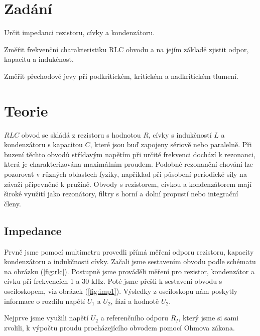 \documentclass[a4paper,11pt]{article}
\begin{document}
\vskip1cm
\begin{minipage}[t]{1\textwidth}
    \section{Zadání}
        Určit impedanci rezistoru, cívky a kondenzátoru. 
        \par Změřit frekvenční charakteristiku RLC obvodu a na jejím základě zjistit odpor, kapacitu a indukčnost.
        \par Změřit přechodové jevy při podkritickém, kritickém a nadkritickém tlumení.
\end{minipage}
    \par
\vspace{10px}
\begin{minipage}[t]{0.5\textwidth} 
    \section{Teorie}
        $RLC$ obvod se skládá z rezistoru s hodnotou $R$, cívky s indukčností $L$ a kondenzátoru s kapacitou $C$, které jsou buď zapojeny sériově nebo paralelně. Při buzení těchto obvodů střídavým napětím při určité frekvenci dochází k rezonanci, která je charakterizována maximálním proudem. Podobné rezonanční chování lze pozorovat v různých oblastech fyziky, například při působení periodické síly na závaží připevněné k pružině. Obvody s rezistorem, cívkou a kondenzátorem mají široké využití jako rezonátory, filtry s horní a dolní propustí nebo integrační členy.
        \subsection{Impedance}
            Prvně jsme pomocí multimetru provedli přímá měření odporu rezistoru, kapacity kondenzátoru a indukčnosti cívky. Začali jsme sestavením obvodu podle schématu na obrázku (\ref{fig:rlc}). Postupně jsme prováděli měření pro rezistor, kondenzátor a cívku při frekvencích 1 a 30 kHz. Poté jsme přešli k sestavení obvodu s osciloskopem, viz obrázek (\ref{fig:imp1}). Výsledky z osciloskopu nám poskytly informace o rozdílu napětí $U_1$ a $U_2$, fázi a hodnotě $U_2$.
            \par Nejprve jsme využili napětí $U_2$ a referenčního odporu $R_I$, který jsme si sami zvolili, k výpočtu proudu procházejícího obvodem pomocí Ohmova zákona.
\end{minipage}
\hspace{10pt}
\end{document}

